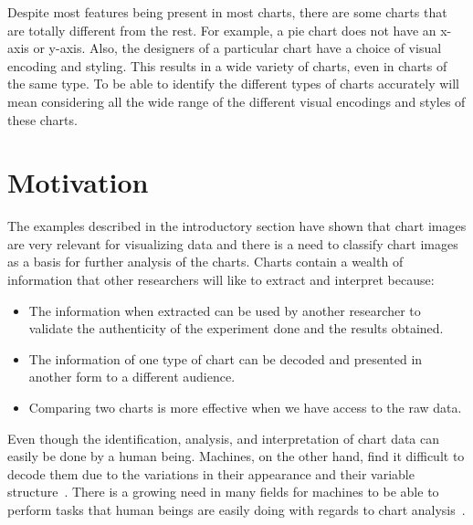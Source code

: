 \documentclass[12pt, a4paper,oneside]{report}
\begin{document}
Despite most features being present in most charts, there are some charts that are totally different from the rest. For example, a pie chart does not have an x-axis or y-axis. Also, the designers of a particular chart have a choice of visual encoding and styling. This results in a wide variety of charts, even in charts of the same type. To be able to identify the different types of charts accurately will mean considering all the wide range of the different visual encodings and styles of these charts.

\section{Motivation}
The examples described in the introductory section have shown that chart images are very relevant for visualizing data and there is a need to classify chart images as a basis for further analysis of the charts. Charts contain a wealth of information that other researchers will like to extract and interpret because:
\begin{itemize}
	\item The information when extracted can be used by another researcher to validate the authenticity of the experiment done and the results obtained.
	
	\item The information of one type of chart can be decoded and presented in another form to a different audience.
	
	\item Comparing two charts is more effective when we have access to the raw data.
\end{itemize} 

Even though the identification, analysis, and interpretation of chart data can easily be done by a human being. Machines, on the other hand, find it difficult to decode them due to the variations in their appearance and their variable structure~\cite{liu2015chart}. There is a growing need in many fields for machines to be able to perform tasks that human beings are easily doing with regards to chart analysis~\cite{amara2017convolutional}. 
\end{document}
